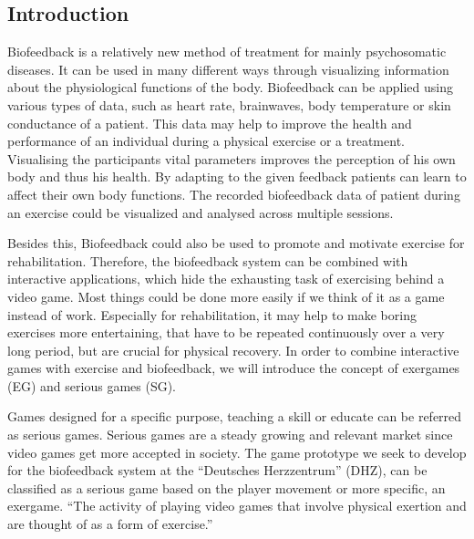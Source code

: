 \begin{multicols}{2}

\section{Introduction}
Biofeedback is a relatively new method of treatment for mainly psychosomatic diseases. It can be used in many different ways through visualizing information about the physiological functions of the body. Biofeedback can be applied using various types of data, such as heart rate, brainwaves, body temperature or skin conductance of a patient. This data may help to improve the health and performance of an individual during a physical exercise or a treatment. Visualising the participants vital parameters improves the perception of his own body and thus his health. By adapting to the given feedback patients can learn to affect their own body functions.\cite{BF2007} The recorded biofeedback data of patient during an exercise could be visualized and analysed across multiple sessions. 

Besides this, Biofeedback could also be used to promote and motivate exercise for rehabilitation. Therefore, the biofeedback system can be combined with interactive applications, which hide the exhausting task of exercising behind a video game. Most things could be done more easily if we think of it as a game instead of work. Especially for rehabilitation, it may help to make boring exercises more entertaining, that have to be repeated continuously over a very long period, but are crucial for physical recovery. In order to combine interactive games with
exercise and biofeedback, we will introduce the concept of exergames (EG) and serious games (SG).

Games designed for a specific purpose, teaching a skill or educate can be referred as serious games. \cite{Derryberry} Serious games are a steady growing and relevant market since video games get more accepted in society. \cite{SGIndustry} The game prototype we seek to develop for the biofeedback system at the “Deutsches Herzzentrum” (DHZ), can be classified as a serious game based on the player movement or more specific, an exergame. “The activity of playing video games that involve physical exertion and are thought of as a form of exercise.” \cite{ExergameDef}


\end{multicols}
